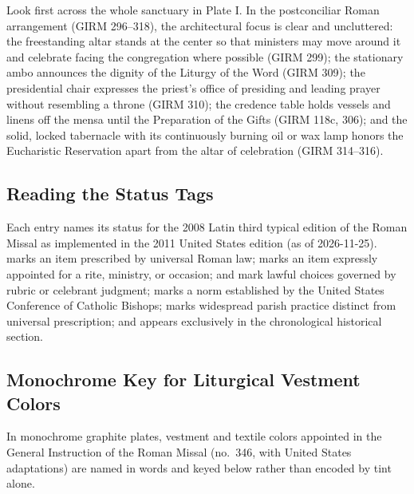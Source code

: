 Look first across the whole sanctuary in Plate I. In the postconciliar Roman arrangement (GIRM 296--318), the architectural focus is clear and uncluttered: the freestanding altar stands at the center so that ministers may move around it and celebrate facing the congregation where possible (GIRM 299); the stationary ambo announces the dignity of the Liturgy of the Word (GIRM 309); the presidential chair expresses the priest's office of presiding and leading prayer without resembling a throne (GIRM 310); the credence table holds vessels and linens off the mensa until the Preparation of the Gifts (GIRM 118c, 306); and the solid, locked tabernacle with its continuously burning oil or wax lamp honors the Eucharistic Reservation apart from the altar of celebration (GIRM 314--316).

\subsection*{Reading the Status Tags}
Each entry names its status for the 2008 Latin third typical edition of the Roman Missal as implemented in the 2011 United States edition (as of 2026-11-25).  marks an item prescribed by universal Roman law;  marks an item expressly appointed for a rite, ministry, or occasion;  and  mark lawful choices governed by rubric or celebrant judgment;  marks a norm established by the United States Conference of Catholic Bishops;  marks widespread parish practice distinct from universal prescription; and  appears exclusively in the chronological historical section.

\subsection*{Monochrome Key for Liturgical Vestment Colors}
In monochrome graphite plates, vestment and textile colors appointed in the General Instruction of the Roman Missal (no.~346, with United States adaptations) are named in words and keyed below rather than encoded by tint alone.

